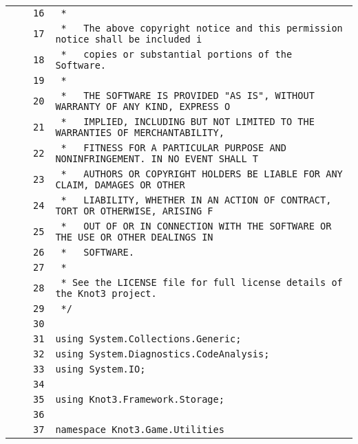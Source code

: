 \documentclass[a4paper,10pt]{article}
\begin{document}
\begin{longtable}[l]{lrrl}
\cellcolor{gray} &  & \verb~16~ & \verb~ *~\\
\cellcolor{gray} &  & \verb~17~ & \verb~ *   The above copyright notice and this permission notice shall be included i~\\
\cellcolor{gray} &  & \verb~18~ & \verb~ *   copies or substantial portions of the Software.~\\
\cellcolor{gray} &  & \verb~19~ & \verb~ *~\\
\cellcolor{gray} &  & \verb~20~ & \verb~ *   THE SOFTWARE IS PROVIDED "AS IS", WITHOUT WARRANTY OF ANY KIND, EXPRESS O~\\
\cellcolor{gray} &  & \verb~21~ & \verb~ *   IMPLIED, INCLUDING BUT NOT LIMITED TO THE WARRANTIES OF MERCHANTABILITY,~\\
\cellcolor{gray} &  & \verb~22~ & \verb~ *   FITNESS FOR A PARTICULAR PURPOSE AND NONINFRINGEMENT. IN NO EVENT SHALL T~\\
\cellcolor{gray} &  & \verb~23~ & \verb~ *   AUTHORS OR COPYRIGHT HOLDERS BE LIABLE FOR ANY CLAIM, DAMAGES OR OTHER~\\
\cellcolor{gray} &  & \verb~24~ & \verb~ *   LIABILITY, WHETHER IN AN ACTION OF CONTRACT, TORT OR OTHERWISE, ARISING F~\\
\cellcolor{gray} &  & \verb~25~ & \verb~ *   OUT OF OR IN CONNECTION WITH THE SOFTWARE OR THE USE OR OTHER DEALINGS IN~\\
\cellcolor{gray} &  & \verb~26~ & \verb~ *   SOFTWARE.~\\
\cellcolor{gray} &  & \verb~27~ & \verb~ *~\\
\cellcolor{gray} &  & \verb~28~ & \verb~ * See the LICENSE file for full license details of the Knot3 project.~\\
\cellcolor{gray} &  & \verb~29~ & \verb~ */~\\
\cellcolor{gray} &  & \verb~30~ & \verb~~\\
\cellcolor{gray} &  & \verb~31~ & \verb~using System.Collections.Generic;~\\
\cellcolor{gray} &  & \verb~32~ & \verb~using System.Diagnostics.CodeAnalysis;~\\
\cellcolor{gray} &  & \verb~33~ & \verb~using System.IO;~\\
\cellcolor{gray} &  & \verb~34~ & \verb~~\\
\cellcolor{gray} &  & \verb~35~ & \verb~using Knot3.Framework.Storage;~\\
\cellcolor{gray} &  & \verb~36~ & \verb~~\\
\cellcolor{gray} &  & \verb~37~ & \verb~namespace Knot3.Game.Utilities~\\

\end{longtable}
\end{document}
